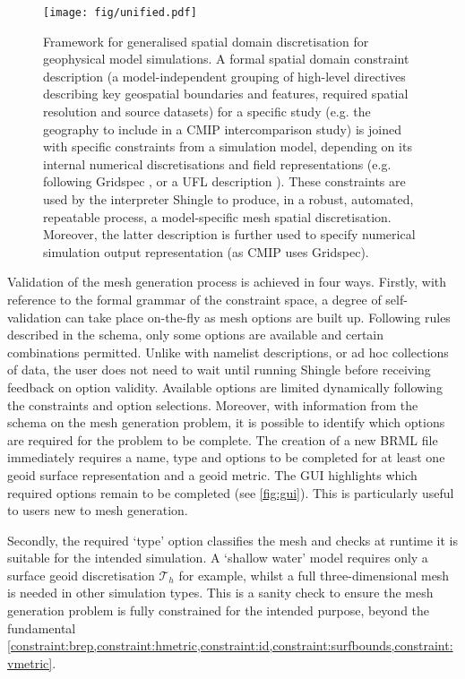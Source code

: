 \documentclass[a4paper, 10pt]{book}
\providecommand{\shingle}{Shingle\xspace}
\providecommand{\brml}{BRML\xspace}
\providecommand{\threed}{three-dimensional\xspace}
\newcommand{\constraints}{\cref{constraint:brep,constraint:hmetric,constraint:id,constraint:surfbounds,constraint:vmetric}\xspace}
\begin{document}
%
\begin{figure}[!h]
\begin{center}
\texttt{[image: fig/unified.pdf]}
\end{center}
\caption{
Framework for generalised spatial domain discretisation for geophysical model simulations.
%
A formal spatial domain constraint description
(a model-independent grouping of high-level directives describing key geospatial boundaries and features, required spatial resolution and source datasets)
for a specific study (e.g. the geography to include in a CMIP intercomparison study) is
joined with specific constraints from a simulation model, depending on its internal numerical discretisations and field representations
(e.g. following Gridspec \citep{gridspec}, or a UFL description \citep{ufl}).
%
These constraints are used by the interpreter \shingle to produce, in a robust, automated, repeatable process, a model-specific mesh spatial discretisation.
Moreover, the latter description is further used to specify numerical simulation output representation
(as CMIP uses Gridspec).
}
\label{fig:unified}
\end{figure}
%
Validation of the mesh generation process is achieved in four ways.
%
Firstly, 
with reference to the formal grammar of the constraint space,
a degree of self-validation can take place on-the-fly as mesh options are built up.
Following rules described in the schema,
only some options are available
and certain combinations permitted.
%
Unlike with namelist descriptions,
or ad hoc collections of data,
%
the user does not need to wait until running \shingle before receiving feedback on option validity.
%
Available options are limited dynamically following the constraints and option selections.
Moreover, with information from the schema on the mesh generation problem, it is possible to identify which options are required for the problem to be complete.
%
The creation of a new \brml file immediately requires a name, type and options to be completed for at least one geoid surface representation and a geoid metric.
%
The GUI highlights which required options remain to be completed (see \cref{fig:gui}).
%
This is particularly useful to users new to mesh generation.
%

Secondly, the required `type' option classifies the mesh and checks at runtime it is suitable for the intended simulation.
%
A `shallow water' model requires only a surface geoid discretisation
$\mathcal{T}_h$ for example, whilst a full \threed mesh is needed in other simulation types.
%
This is a sanity check to ensure the mesh generation problem is fully constrained for the intended purpose, beyond the fundamental \constraints.
\end{document}

